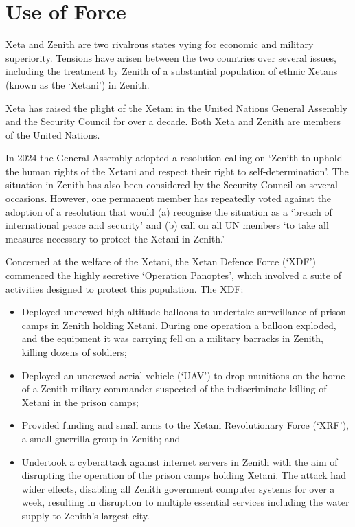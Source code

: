 \section{Use of Force}
\begin{tutorialquestion}
    \flushleft
    Xeta and Zenith are two rivalrous states vying for economic and military superiority. Tensions have arisen between the two countries over several issues, including the treatment by Zenith of a substantial population of ethnic Xetans (known as the `Xetani') in Zenith.

    \vspace{\baselineskip}

    Xeta has raised the plight of the Xetani in the United Nations General Assembly and the Security Council for over a decade. Both Xeta and Zenith are members of the United Nations.

    \vspace{\baselineskip}
    
    In 2024 the General Assembly adopted a resolution calling on `Zenith to uphold the human rights of the Xetani and respect their right to self-determination'. The situation in Zenith has also been considered by the Security Council on several occasions. However, one permanent member has repeatedly voted against the adoption of a resolution that would (a) recognise the situation as a `breach of international peace and security' and (b) call on all UN members `to take all measures necessary to protect the Xetani in Zenith.'

    \vspace{\baselineskip}

    Concerned at the welfare of the Xetani, the Xetan Defence Force (`XDF') commenced the highly secretive `Operation Panoptes', which involved a suite of activities designed to protect this population. The XDF:
    \begin{itemize}
        \item Deployed uncrewed high-altitude balloons to undertake surveillance of prison camps in Zenith holding Xetani. During one operation a balloon exploded, and the equipment it was carrying fell on a military barracks in Zenith, killing dozens of soldiers;
        \item Deployed an uncrewed aerial vehicle (`UAV') to drop munitions on the home of a Zenith miliary commander suspected of the indiscriminate killing of Xetani in the prison camps;
        \item Provided funding and small arms to the Xetani Revolutionary Force (`XRF'), a small guerrilla group in Zenith; and
        \item Undertook a cyberattack against internet servers in Zenith with the aim of disrupting the operation of the prison camps holding Xetani. The attack had wider effects, disabling all Zenith government computer systems for over a week, resulting in disruption to multiple essential services including the water supply to Zenith's largest city.
    \end{itemize}


\end{tutorialquestion}
